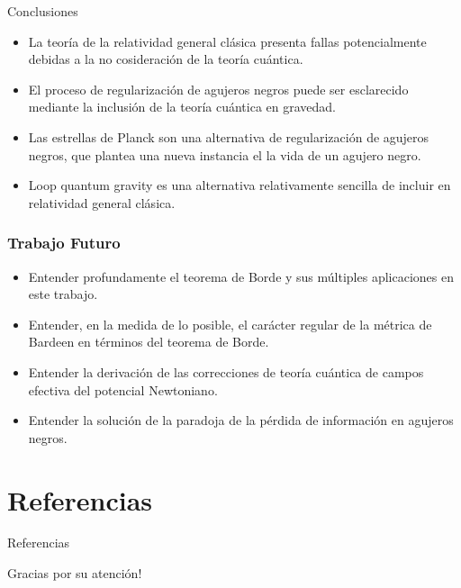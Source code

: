 \documentclass[t]{beamer}
\numberwithin{equation}{section}
\begin{document}
\begin{frame}{Conclusiones}
\begin{itemize}
\item La teoría de la relatividad general clásica presenta fallas potencialmente debidas a la no cosideración de la teoría cuántica.
\vspace*{\fill}
\item El proceso de regularización de agujeros negros puede ser esclarecido mediante la inclusión de la teoría cuántica en gravedad.
\vspace{\fill}
\item Las estrellas de Planck son una alternativa de regularización de agujeros negros, que plantea una nueva instancia el la vida de un agujero negro.
\vspace*{\fill}
\item Loop quantum gravity es una alternativa relativamente sencilla de incluir en relatividad general clásica.
\end{itemize}
\end{frame}


\begin{frame}
\frametitle{Trabajo Futuro}
\vspace{\fill}
\begin{itemize}
\item Entender profundamente el teorema de Borde y sus múltiples aplicaciones en este trabajo.



\item Entender, en la medida de lo posible, el carácter regular de la métrica de Bardeen en términos del teorema de Borde.


\item Entender la derivación de las correcciones de teoría cuántica de campos efectiva del potencial Newtoniano.

\item Entender la solución de la paradoja de la pérdida de información en agujeros negros.
\end{itemize}
\vspace{\fill}
\end{frame}

\section{Referencias}
\begin{frame}{Referencias}
\footnotesize


\end{frame}
 

\begin{frame}
\Huge{
\vspace{\fill}
\centerline{
Gracias por su atención!}
}
\vspace{\fill}
\end{frame}
\end{document}
